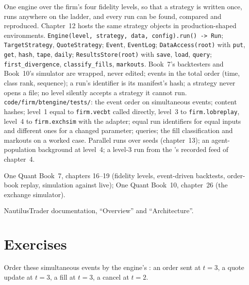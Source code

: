 \begin{build}
 One engine over the firm's four fidelity levels, so that a strategy is written once, runs anywhere on the ladder, and
every run can be found, compared and reproduced. Chapter~12 hosts the same strategy objects in production-shaped environments.
 \texttt{Engine(level, strategy, data, config).run() -> Run}; \texttt{TargetStrategy}, \texttt{QuoteStrategy};
\texttt{Event}, \texttt{EventLog}; \texttt{DataAccess(root)} with \texttt{put}, \texttt{get}, \texttt{hash}, \texttt{tape},
\texttt{daily}; \texttt{ResultsStore(root)} with \texttt{save}, \texttt{load}, \texttt{query}; \texttt{first\_divergence},
\texttt{classify\_fills}, \texttt{markouts}.
 Book~7's backtesters and Book~10's simulator are wrapped, never edited; events in the total order (time, class rank,
sequence); a run's identifier is its manifest's hash; a strategy never opens a file; no level silently accepts a strategy it cannot run.
 \texttt{code/firm/btengine/tests/}: the event order on simultaneous events; content hashes; level~1 equal to
\texttt{firm.vecbt} called directly, level~3 to \texttt{firm.lobreplay}, level~4 to \texttt{firm.exchsim} with the adapter; equal run
identifiers for equal inputs and different ones for a changed parameter; queries; the fill classification and markouts on a worked case.
 Parallel runs over seeds (chapter~13); an agent-population background at level~4; a level-3 run from the 's
recorded feed of chapter~4.
\end{build}

\begin{omsources}
\item One Quant Book~7, chapters 16--19 (fidelity levels, event-driven backtests, order-book replay, simulation against live); One Quant
Book~10, chapter~26 (the exchange simulator).
\item NautilusTrader documentation, ``Overview'' and ``Architecture''.
\end{omsources}

\section{Exercises}

\begin{exercise}[$\star$]\label{exo:pl:backtest-engine-architecture:1}
Order these simultaneous events by the engine's : an order sent at $t = 3$, a quote update at $t = 3$, a fill at $t = 3$, a
cancel at $t = 2$.
\end{exercise}

